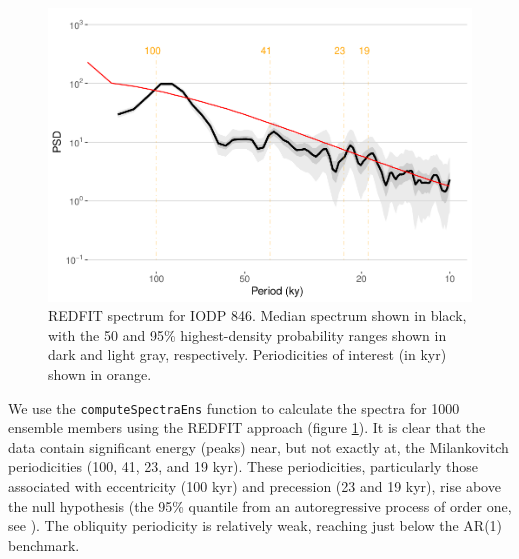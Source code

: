\documentclass[gchron, manuscript]{copernicus}
\begin{document}
\begin{figure}
\includegraphics[width=12cm]{geoChronR-paper_files/figure-latex/redfit-plot-1} \caption{REDFIT spectrum for IODP 846. Median spectrum shown in black, with the 50 and 95\% highest-density probability ranges shown in dark and light gray, respectively. Periodicities of interest (in kyr) shown in orange.}\label{fig:redfit-plot}
\end{figure}

We use the \texttt{computeSpectraEns} function to calculate the spectra for 1000 ensemble members using the REDFIT approach (figure \ref{fig:redfit-plot}). It is clear that the data contain significant energy (peaks) near, but not exactly at, the Milankovitch periodicities (100, 41, 23, and 19 kyr). These periodicities, particularly those associated with eccentricity (100 kyr) and precession (23 and 19 kyr), rise above the null hypothesis (the 95\% quantile from an autoregressive process of order one, see \citet{Mudelsee_NPG09}).
The obliquity periodicity is relatively weak, reaching just below the AR(1) benchmark.
\end{document}
